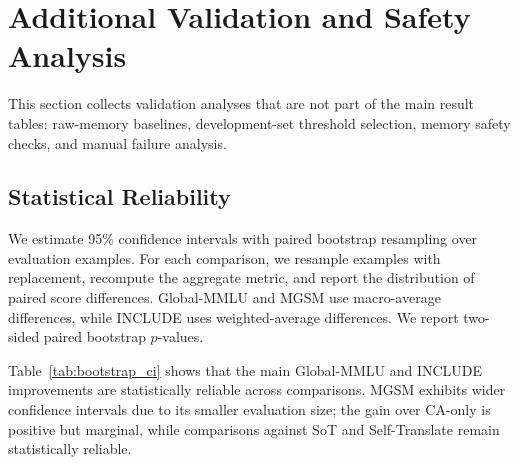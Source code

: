 \documentclass[11pt]{article}
\begin{document}
\section{Additional Validation and Safety Analysis}
\label{sec:app_additional_validation}
This section collects validation analyses that are not part of the main result tables: raw-memory baselines, development-set threshold selection, memory safety checks, and manual failure analysis.

\subsection{Statistical Reliability}
\label{sec:app_statistical_reliability}

We estimate 95\% confidence intervals with paired bootstrap resampling over evaluation examples. For each comparison, we resample examples with replacement, recompute the aggregate metric, and report the distribution of paired score differences. Global-MMLU and MGSM use macro-average differences, while INCLUDE uses weighted-average differences. We report two-sided paired bootstrap $p$-values.

Table~\ref{tab:bootstrap_ci} shows that the main Global-MMLU and INCLUDE improvements are statistically reliable across comparisons. MGSM exhibits wider confidence intervals due to its smaller evaluation size; the gain over CA-only is positive but marginal, while comparisons against SoT and Self-Translate remain statistically reliable.
\end{document}
